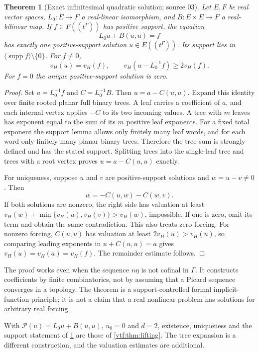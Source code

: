 \documentclass[11pt,letterpaper]{article}
\newtheorem{theorem}{Theorem}[section]
\theoremstyle{definition}
\theoremstyle{remark}
\newcommand{\supp}{\operatorname{supp}}\newcommand{\st}{\operatorname{st}}
\newcommand{\vH}{v_{\!H}}
\begin{document}
\begin{theorem}[Exact infinitesimal quadratic solution; source 03]\label{vtf:3d:thm:quadratic}
Let $E,F$ be real vector spaces, $L_0:E\to F$ a real-linear isomorphism, and $B:E\times E\to F$ a real-bilinear map. If $f\in F((t^\Gamma))$ has positive support, the equation
\begin{equation}\label{vtf:3d:eq:quadratic}
 L_0u+B(u,u)=f
\end{equation}
has exactly one positive-support solution $u\in E((t^\Gamma))$. Its support lies in
$\langle\supp f\rangle\setminus\{0\}$. For $f\ne0$,
\[
 \vH(u)=\vH(f),\qquad
 \vH(u-L_0^{-1}f)\geq2\vH(f).
\]
For $f=0$ the unique positive-support solution is zero.
\end{theorem}
\begin{proof}
Set $a=L_0^{-1}f$ and $C=L_0^{-1}B$. Then $u=a-C(u,u)$. Expand this identity over finite rooted planar full binary trees. A leaf carries a coefficient of $a$, and each internal vertex applies $-C$ to its two incoming values. A tree with $m$ leaves has exponent equal to the sum of its $m$ positive leaf exponents. For a fixed total exponent the support lemma allows only finitely many leaf words, and for each word only finitely many planar binary trees. Therefore the tree sum is strongly defined and has the stated support. Splitting trees into the single-leaf tree and trees with a root vertex proves $u=a-C(u,u)$ exactly.

For uniqueness, suppose $u$ and $v$ are positive-support solutions and $w=u-v\ne0$. Then
\[
 w=-C(u,w)-C(w,v).
\]
If both solutions are nonzero, the right side has valuation at least
$\vH(w)+\min\{\vH(u),\vH(v)\}>\vH(w)$, impossible. If one is zero, omit its term and obtain the same contradiction. This also treats zero forcing. For nonzero forcing, $C(u,u)$ has valuation at least $2\vH(u)>\vH(u)$, so comparing leading exponents in $u+C(u,u)=a$ gives $\vH(u)=\vH(a)=\vH(f)$. The remainder estimate follows.
\end{proof}

The proof works even when the sequence $n\eta$ is not cofinal in $\Gamma$. It constructs coefficients by finite combinatorics, not by assuming that a Picard sequence converges in a topology. The theorem is a support-controlled formal implicit-function principle; it is not a claim that a real nonlinear problem has solutions for arbitrary real forcing.

With $\mathcal P(u)=L_0u+B(u,u)$, $u_0=0$ and $d=2$, existence, uniqueness and
the support statement of \cref{vtf:3d:thm:quadratic} are those of
\cref{vtf:thm:lifting}. The tree expansion is a different construction, and the
valuation estimates are additional.
\end{document}
